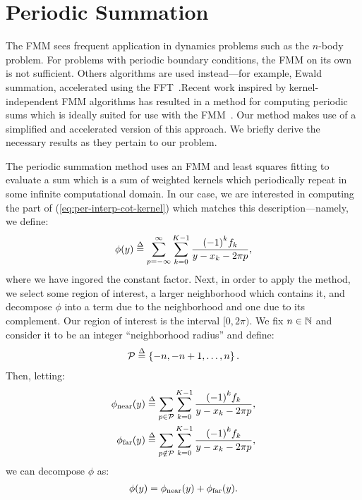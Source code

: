 \section{Periodic Summation}

The FMM sees frequent application in dynamics problems such as the
$n$-body problem. For problems with periodic boundary conditions, the
FMM on its own is not sufficient. Others algorithms are used
instead---for example, Ewald summation, accelerated using the
FFT~\cite{ewald}.\@ Recent work inspired by kernel-independent FMM
algorithms has resulted in a method for computing periodic sums which
is ideally suited for use with the FMM~\cite{periodic-sums}. Our
method makes use of a simplified and accelerated version of this
approach. We briefly derive the necessary results as they pertain to
our problem.

The periodic summation method uses an FMM and least squares fitting to
evaluate a sum which is a sum of weighted kernels which periodically
repeat in some infinite computational domain. In our case, we are
interested in computing the part of (\ref{eq:per-interp-cot-kernel})
which matches this description---namely, we define:
\begin{align}
  \label{eq:phi}
  \phi(y{}) \overset{\Delta}{=} \sum_{p{}=-\infty}^\infty \sum_{k{}=0}^{K{}-1} \frac{{(-1)}^{k{}}{f}_{k{}}}{y{} - {x}_{k{}} - 2\pi{}p{}},
\end{align}
where we have ingored the constant factor. Next, in order to apply the
method, we select some region of interest, a larger neighborhood which
contains it, and decompose $\phi$ into a term due to the neighborhood
and one due to its complement. Our region of interest is the interval
$[0, 2\pi)$. We fix $n\in\mathbb{N}$ and consider it to be
an integer ``neighborhood radius'' and define:
\begin{align}
  \label{eq:neighborhood}
  \mathcal{P} \overset{\Delta}{=} \left\{-n, -n+1, \hdots, n\right\}.
\end{align}
Then, letting:
\begin{align}
  \phi_{\operatorname{near}}(y) &\overset{\Delta}{=} \sum_{p\in\mathcal{P}}\sum_{k=0}^{K-1} \frac{{(-1)}^k{f}_{k}}{y-{x}_{k}-2\pi p}, \label{eq:phinear} \\
  \phi_{\operatorname{far}}(y) &\overset{\Delta}{=} \sum_{p\notin\mathcal{P}}\sum_{k=0}^{K-1} \frac{{(-1)}^k{f}_{k}}{y-{x}_{k}-2\pi p}, \label{eq:phifar}
\end{align}
we can decompose $\phi$ as:
\begin{align}
  \label{eq:phinear-plus-phifar}
  \phi(y) = \phi_{\operatorname{near}}(y) + \phi_{\operatorname{far}}(y).
\end{align}

